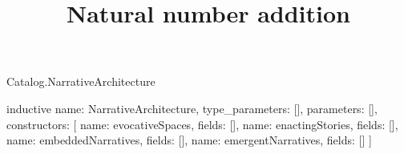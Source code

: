 \begin{lexlean}{Catalog.NarrativeArchitecture}
\title{Natural number addition}
\begin{semanticmodule}
inductive{
  name: NarrativeArchitecture,
  type_parameters: [],
  parameters: [],
  constructors: [
    {name: evocativeSpaces, fields: []},
    {name: enactingStories, fields: []},
    {name: embeddedNarratives, fields: []},
    {name: emergentNarratives, fields: []}
  ]
}
\end{semanticmodule}
\end{lexlean}
